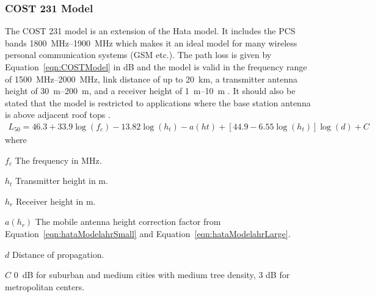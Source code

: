 \subsubsection{COST 231 Model}
The COST 231 model is an extension of the Hata model. It includes the PCS bands \SIrange{1800}{1900}{MHz} which makes it an ideal model for many wireless personal communication systems (GSM etc.). The path loss is given by Equation~\ref{eqn:COSTModel} in dB \cite{Seybold2005introduction} and the model is valid in the frequency range of  \SIrange{1500}{2000}{MHz}, link distance of up to \SI{20}{km}, a transmitter antenna height of \SIrange{30}{200}{m}, and a receiver height of \SIrange{1}{10}{m} \cite{Seybold2005introduction}. It should also be stated that the model is restricted to applications where the base station antenna is above adjacent roof tops \cite{itu2002report}.
\begin{align} 
    \label{eqn:COSTModel}
    L_{50} = 46.3+33.9 \log(f_c)-13.82 \log(h_t)-a(ht)+[44.9-6.55 \log(h_t)] \log(d) + C 
\end{align} 
where 
\begin{where}
\item [$f_c$] The frequency in \si{MHz}.
\item [$h_t$] Transmitter height in \si{m}. 
\item [$h_r$] Receiver height in \si{m}.
\item [$a(h_r)$] The mobile antenna height correction factor from Equation~\ref{eqn:hataModelahrSmall} and Equation~\ref{eqn:hataModelahrLarge}.
\item [$d$] Distance of propagation.
\item [$C$] \SI{0}{dB} for suburban and medium cities with medium tree density, 3 dB for metropolitan centers. 
\end{where}


